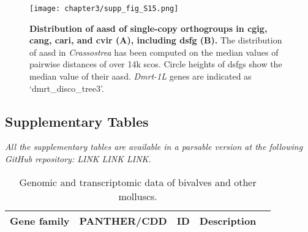 \documentclass[../main.tex]{subfiles}
\begin{document}
\begin{figure}[ht]
	\centering
	\texttt{[image: chapter3/supp\_fig\_S15.png]}
	\captionsetup{width=\textwidth}
	\caption{
		\textbf{Distribution of \gls{aasd} of single-copy orthogroups in \gls{cgig}, \gls{cang}, \gls{cari}, and \gls{cvir} (A), including \gls{dsfg} (B).} The distribution of \gls{aasd} in \textit{Crassostrea} has been computed on the median values of pairwise distances of over 14k \glspl{sco}. Circle heights of \glspl{dsfg} show the median value of their \gls{aasd}. \textit{Dmrt-1L} genes are indicated as ‘dmrt\_disco\_tree3’.
	}
	\label{suppFig:DSFG_crassostreaDivergence}
\end{figure}

\clearpage

\subsection{Supplementary Tables}

\textit{All the supplementary tables are available in a parsable version at the following GitHub repository: LINK LINK LINK.}

\setcounter{table}{0}
\renewcommand{\tablename}{Supplementary Table}
\renewcommand{\thetable}{S\arabic{chapter}.\arabic{table}}

\begin{landscape}
	\tiny
	\begin{longtable}{@{}cllll@{}}
		\caption{Genomic and transcriptomic data of bivalves and other molluscs.}
		\label{suppTab:bivalve_dataset}                                                    \\
		\toprule
		\textbf{Gene family} & \textbf{PANTHER/CDD} & \textbf{ID} & \textbf{Description} & \\* \midrule \midrule
	\end{longtable}
\end{landscape}
\end{document}

